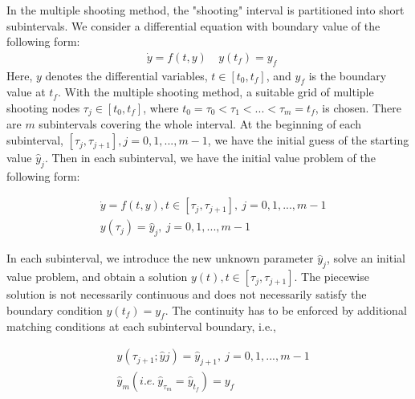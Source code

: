 In the multiple shooting method, the "shooting" interval is partitioned into short subintervals. We consider a differential equation with boundary value of the following form:
\begin{equation}\label{eqn:ori_dae}
	\begin{aligned}
		& \dot{y} = f(t, y) \
		& y(t_f) = y_f \
	\end{aligned}
\end{equation}
Here, $y$ denotes the differential variables, $t \in [t_0, t_f]$, and $y_f$ is the boundary value at $t_f$. With the multiple shooting method, a suitable grid of multiple shooting nodes $\tau_j \in [t_0,t_f]$, where $t_0 = \tau_0 < \tau_1 < ... < \tau_m = t_f$, is chosen. There are $m$ subintervals covering the whole interval. At the beginning of each subinterval, $[\tau_j, \tau_{j+1}], j = 0, 1, ..., m-1$, we have the initial guess of the starting value $\hat{y}_j$. Then in each subinterval, we have the initial value problem of the following form:

\begin{equation}\label{eqn:msh}
	\begin{aligned}
		& \dot{y} = f(t, y) , t \in [\tau_j, \tau_{j+1}], \ j = 0, 1, ..., m-1  \\
		& y(\tau_j) = \hat{y}_j, \ j = 0, 1, ..., m-1 \
	\end{aligned}
\end{equation}

In each subinterval, we introduce the new unknown parameter $\hat{y}_j$, solve an initial value problem, and obtain a solution $y(t), t \in [\tau_j, \tau_{j+1}]$. The piecewise solution is not necessarily continuous and does not necessarily satisfy the boundary condition $y(t_f) = y_f$. The continuity has to be enforced by additional matching conditions at each subinterval boundary, i.e.,

\begin{equation}\label{eqn:mc}
	\begin{aligned}
		& y(\tau_{j+1}; \hat{y}j) = \hat{y}_{j+1}, \ j = 0, 1, ..., m-1  \\
		& \hat{y}_{m} (i.e. \ \hat{y}_{\tau_m} = \hat{y}_{t_f}) =  y_f 
	\end{aligned}
\end{equation}





